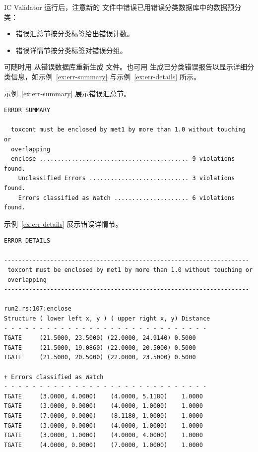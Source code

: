 IC Validator 运行后，注意新的  文件中错误已用错误分类数据库中的数据预分类：
\begin{itemize}
  \item 错误汇总节按分类标签给出错误计数。
  \item 错误详情节按分类标签对错误分组。
\end{itemize}

\begin{noteBox}
可随时用  从错误数据库重新生成  文件。也可用  生成已分类错误报告以显示详细分类信息，如示例~\ref{ex:err-summary} 与示例~\ref{ex:err-details} 所示。
\end{noteBox}

示例~\ref{ex:err-summary} 展示错误汇总节。

\begin{lstlisting}[style=shell,caption={错误汇总节},label={ex:err-summary}]
                       ERROR SUMMARY

  toxcont must be enclosed by met1 by more than 1.0 without touching or
  overlapping
  enclose .......................................... 9 violations found.
    Unclassified Errors ............................ 3 violations found.
    Errors classified as Watch ..................... 6 violations found.
\end{lstlisting}

示例~\ref{ex:err-details} 展示错误详情节。

\begin{lstlisting}[style=shell,caption={错误详情节},label={ex:err-details}]
                       ERROR DETAILS

---------------------------------------------------------------------
 toxcont must be enclosed by met1 by more than 1.0 without touching or
 overlapping
---------------------------------------------------------------------

run2.rs:107:enclose
Structure ( lower left x, y ) ( upper right x, y) Distance
- - - - - - - - - - - - - - - - - - - - - - - - - - - - -
TGATE     (21.5000, 23.5000) (22.0000, 24.9140) 0.5000
TGATE     (21.5000, 19.0860) (22.0000, 20.5000) 0.5000
TGATE     (21.5000, 20.5000) (22.0000, 23.5000) 0.5000

+ Errors classified as Watch
- - - - - - - - - - - - - - - - - - - - - - - - - - - - -
TGATE     (3.0000, 4.0000)    (4.0000, 5.1180)    1.0000
TGATE     (3.0000, 0.0000)    (4.0000, 1.0000)    1.0000
TGATE     (7.0000, 0.0000)    (8.1180, 1.0000)    1.0000
TGATE     (3.0000, 0.0000)    (4.0000, 1.0000)    1.0000
TGATE     (3.0000, 1.0000)    (4.0000, 4.0000)    1.0000
TGATE     (4.0000, 0.0000)    (7.0000, 1.0000)    1.0000
\end{lstlisting}

